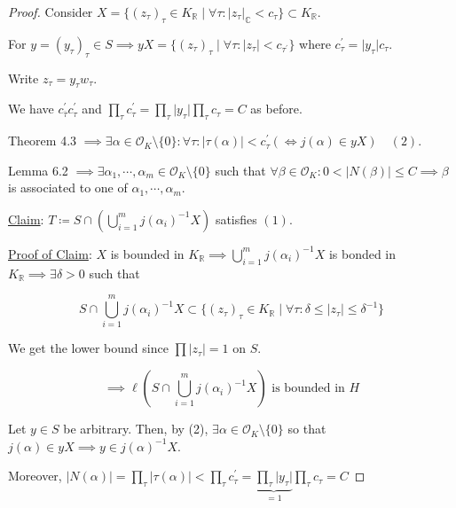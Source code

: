 \documentclass[openany]{amsbook}
\numberwithin{section}{chapter}
\theoremstyle{definition}
\begin{document}
\begin{proof}
    Consider \(X = \{ (z_{\tau})_{\tau} \in K_\mathbb{R} \mid \forall \tau  : \vert z_{\tau}  \vert _\mathbb{C} < c_{\tau}  \} \subset K_\mathbb{R} \).
    
    For \(y = (y_{\tau})_{\tau} \in S \implies y X = \{ (z_{\tau})_{\tau} \mid \forall \tau : \vert z_{\tau} \vert < c_{\tau ^{\prime}} \}  \) where \(\boxed{c_{\tau} ^{\prime}  = \vert y_{\tau}  \vert c_{\tau}}\).

    Write \(z_{\tau} = y_{\tau} w_{\tau}\).

    We have \(c^{\prime}_{\overline{\tau }}  c^{\prime}_{\tau}\) and \(\prod_{\tau} c_{\tau} ^{\prime} = \prod_{\tau} \vert y_{\tau} \vert \prod_{\tau} c_{\tau} = C \) as before.
    
    Theorem 4.3 \(\implies \exists \alpha \in \mathcal{O}_K \setminus \{ 0 \} : \forall \tau : \vert \tau (\alpha) \vert < c_{\tau}^{\prime} (\iff j(\alpha) \in y X) \quad (2)\).
    
    Lemma 6.2 \(\implies \exists \alpha_1, \cdots , \alpha_m \in \mathcal{O}_K \setminus \{ 0 \}\) such that \(\forall \beta \in \mathcal{O}_K : 0 < \vert N(\beta) \vert \leq C \implies \beta\) is associated to one of \(\alpha_1, \cdots , \alpha_m\).

    \underline{Claim}: \(T\coloneqq S \cap  \left( \bigcup_{i=1}^{m} j(\alpha_i)^{-1} X \right) \) satisfies \((1)\).

    \underline{Proof of Claim}: \(X\) is bounded in \(K_\mathbb{R} \implies \bigcup_{i=1}^{m} j(\alpha_i)^{-1} X\) is bonded in \(K_\mathbb{R} \implies \exists \delta > 0\) such that

    \[
        S \cap \bigcup_{i=1}^{m} j (\alpha_i) ^{-1} X \subset \{ (z_{\tau})_{\tau} \in K_\mathbb{R} \mid \forall \tau : \delta \leq \vert z_{\tau} \vert \leq \delta ^{-1}    \} 
    \]

    We get the lower bound since \(\prod \vert z_{\tau} \vert = 1\) on \(S\).

    \[
        \implies \ell \left( S \cap \bigcup_{i=1}^{m} j (\alpha _i)^{-1} X \right) \text{ is bounded in } H
    \]

    Let \(y\in S\) be arbitrary. Then, by (2), \(\exists \alpha \in \mathcal{O}_K \setminus \{ 0 \} \) so that \(j(\alpha) \in yX \implies y\in j(\alpha)^{-1} X\).
    
    Moreover, \(\vert N(\alpha) \vert = \prod_{\tau} \vert \tau(\alpha) \vert < \prod_{\tau} c_{\tau} ^{\prime} = \underbrace{\prod_{\tau} \vert y_{\tau}  \vert }_{=1} \prod_{\tau} c_\tau = C \) 


\end{proof}
\end{document}
